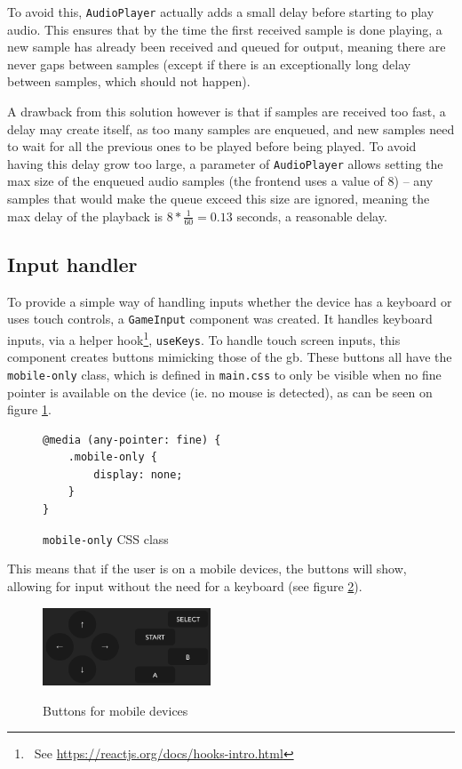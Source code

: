 \documentclass[11pt]{informatics-report}
\newcommand{\ftnt}[1]{\footnote{~See \url{#1}}}
\begin{document}
To avoid this, \texttt{AudioPlayer} actually adds a small delay before starting to play audio. This ensures that by the time the first received sample is done playing, a new sample has already been received and queued for output, meaning there are never gaps between samples (except if there is an exceptionally long delay between samples, which should not happen).

A drawback from this solution however is that if samples are received too fast, a delay may create itself, as too many samples are enqueued, and new samples need to wait for all the previous ones to be played before being played. To avoid having this delay grow too large, a parameter of \texttt{AudioPlayer} allows setting the max size of the enqueued audio samples (the frontend uses a value of 8) -- any samples that would make the queue exceed this size are ignored, meaning the max delay of the playback is $8*\frac{1}{60}=0.13$ seconds, a reasonable delay.

\subsection{Input handler}

To provide a simple way of handling inputs whether the device has a keyboard or uses touch controls, a \texttt{GameInput} component was created. It handles keyboard inputs, via a helper hook\ftnt{https://reactjs.org/docs/hooks-intro.html}, \texttt{useKeys}. To handle touch screen inputs, this component creates buttons mimicking those of the \gls{gb}. These buttons all have the \texttt{mobile-only} class, which is defined in \texttt{main.css} to only be visible when no fine pointer is available on the device (ie. no mouse is detected), as can be seen on figure \ref{fig:css-mobile-only}.

\begin{figure}[h]
    \begin{verbatim}
@media (any-pointer: fine) {
    .mobile-only {
        display: none;
    }
}
    \end{verbatim}
    \caption{\texttt{mobile-only} CSS class}
    \label{fig:css-mobile-only}
\end{figure}

This means that if the user is on a mobile devices, the buttons will show, allowing for input without the need for a keyboard (see figure \ref{fig:ui-mobile-buttons}).

\begin{figure}[h]
    \centering
    \includegraphics[width=5cm]{images/ui-mobile-buttons}\\
    \caption{Buttons for mobile devices}
    \label{fig:ui-mobile-buttons}
\end{figure}
\end{document}
